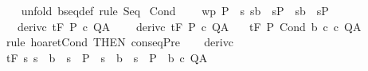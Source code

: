\begin{isabellebody}
%
\isadelimproof
\ \ %
\endisadelimproof
%
\isatagproof
{}\isamarkupfalse%
\ {\isacharparenleft}unfold\ bseq{\isacharunderscore}def{\isacharparenright}\ {\isacharparenleft}rule\ Seq{\isacharparenright}%
\endisatagproof
{\isafoldproof}%
%
\isadelimproof
\isanewline
%
\endisadelimproof
\isanewline
{}\isamarkupfalse%
\ Cond{\isacharcolon}\ \isanewline
\ \ \ wp{\isacharcolon}\ {\isachardoublequoteopen}P\ {\isasymsubseteq}\ {\isacharbraceleft}s{\isachardot}\ {\isacharparenleft}s{\isasymin}b\ {\isasymlongrightarrow}\ s{\isasymin}P\ {\isasymand}\ {\isacharparenleft}s{\isasymnotin}b\ {\isasymlongrightarrow}\ s{\isasymin}P\ \isanewline
\ \ \ deriv{\isacharunderscore}c{}{\isacharcolon}\ {\isachardoublequoteopen}{\isasymGamma}{\isacharcomma}{\isasymTheta}{\isasymturnstile}\isactrlsub t\isactrlbsub {\isacharslash}F\isactrlesub \ P\ c\ Q{\isacharcomma}A{\isachardoublequoteclose}\ \isanewline
\ \ \ deriv{\isacharunderscore}c{}{\isacharcolon}\ {\isachardoublequoteopen}{\isasymGamma}{\isacharcomma}{\isasymTheta}{\isasymturnstile}\isactrlsub t\isactrlbsub {\isacharslash}F\isactrlesub \ P\ c\ Q{\isacharcomma}A{\isachardoublequoteclose}\isanewline
\ \ \ {\isachardoublequoteopen}{\isasymGamma}{\isacharcomma}{\isasymTheta}{\isasymturnstile}\isactrlsub t\isactrlbsub {\isacharslash}F\isactrlesub \ P\ {\isacharparenleft}Cond\ b\ c\ c\ Q{\isacharcomma}A{\isachardoublequoteclose}\isanewline
%
\isadelimproof
%
\endisadelimproof
%
\isatagproof
{}\isamarkupfalse%
\ {\isacharparenleft}rule\ hoaret{\isachardot}Cond\ {\isacharbrackleft}THEN\ conseqPre{\isacharbrackright}{\isacharparenright}\isanewline
\ \ \isamarkupfalse%
\ deriv{\isacharunderscore}c{}\ \isanewline
\ \ \isamarkupfalse%
\ {\isachardoublequoteopen}{\isasymGamma}{\isacharcomma}{\isasymTheta}{\isasymturnstile}\isactrlsub t\isactrlbsub {\isacharslash}F\isactrlesub \ {\isacharparenleft}{\isacharbraceleft}s{\isachardot}\ {\isacharparenleft}s\ {\isasymin}\ b\ {\isasymlongrightarrow}\ s\ {\isasymin}\ P\ {\isasymand}\ {\isacharparenleft}s\ {\isasymnotin}\ b\ {\isasymlongrightarrow}\ s\ {\isasymin}\ P\ {\isasyminter}\ b{\isacharparenright}\ c\ Q{\isacharcomma}A{\isachardoublequoteclose}\isanewline

\end{isabellebody}
